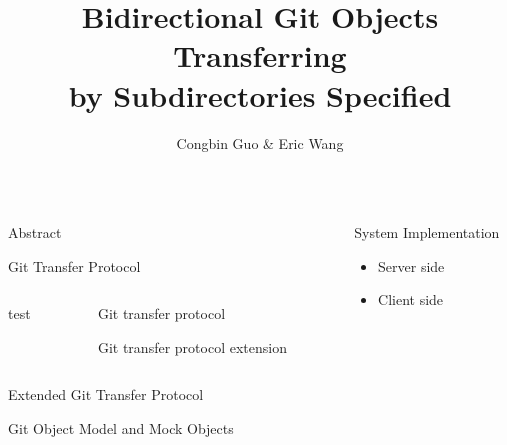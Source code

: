 \documentclass[final]{beamer}
\title{Bidirectional Git Objects Transferring\\ by Subdirectories Specified}
\author{Congbin Guo \& Eric Wang}
\institute{VMware Inc.}
\begin{document}
\begin{frame}[t]
  \begin{columns}[t]
    \begin{column}{.5\linewidth}
      \begin{block}{Abstract}
        
      \end{block}
      \begin{block}{Git Transfer Protocol}
        \begin{minipage}{\textwidth}
        \begin{columns}
          \begin{column}{.5\textwidth}
            test
          \end{column}
          \begin{column}{.5\textwidth}
            \begin{figure}[htpb]
              \centering
              \caption{Git transfer protocol}
              \label{fig:git-proto}
            \end{figure}
            \begin{figure}[htpb]
              \centering
              \caption{Git transfer protocol extension}
              \label{fig:git-proto-ext}
            \end{figure}
          \end{column}
        \end{columns}
      \end{minipage}
      \end{block}
      \begin{block}{Extended Git Transfer Protocol}
      \end{block}

      \begin{block}{Git Object Model and Mock Objects}
      \end{block}
    \end{column}
    \begin{column}{.5\linewidth}
      \begin{block}{System Implementation}
        \begin{itemize}
          \item Server side
          \item Client side
        \end{itemize}
      \end{block}
    \end{column}
  \end{columns}
\end{frame}
\end{document}
